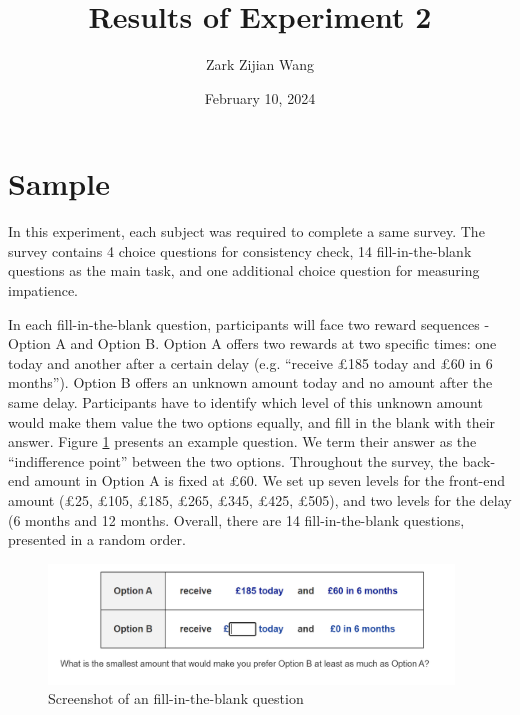 \documentclass[
  12pt,
]{article}
\title{Results of Experiment 2}
\author{Zark Zijian Wang}
\date{February 10, 2024}
\begin{document}
\maketitle

\hypertarget{sample}{%
\section{Sample}\label{sample}}

In this experiment, each subject was required to complete a same survey.
The survey contains 4 choice questions for consistency check, 14
fill-in-the-blank questions as the main task, and one additional choice
question for measuring impatience.

In each fill-in-the-blank question, participants will face two reward
sequences - Option A and Option B. Option A offers two rewards at two
specific times: one today and another after a certain delay (e.g.
``receive £185 today and £60 in 6 months''). Option B offers an unknown
amount today and no amount after the same delay. Participants have to
identify which level of this unknown amount would make them value the
two options equally, and fill in the blank with their answer. Figure
\ref{fig:fill-blank-screen} presents an example question. We term their
answer as the ``indifference point'' between the two options. Throughout
the survey, the back-end amount in Option A is fixed at £60. We set up
seven levels for the front-end amount (£25, £105, £185, £265, £345,
£425, £505), and two levels for the delay (6 months and 12 months.
Overall, there are 14 fill-in-the-blank questions, presented in a random
order.

\begin{figure}
  \vspace{16pt}
  \centering
  \includegraphics[width=0.96\textwidth]{figures/screenshot.png}
  \caption{Screenshot of an fill-in-the-blank question}
  \label{fig:fill-blank-screen}
\end{figure}
\end{document}
